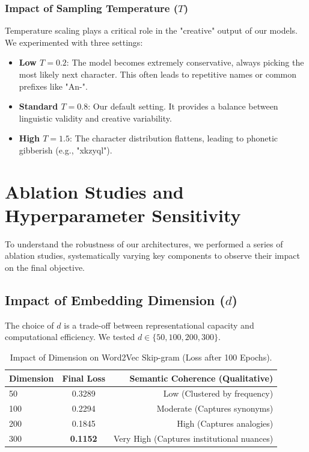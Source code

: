 \documentclass[12pt,a4paper]{article}
\begin{document}
\subsubsection{Impact of Sampling Temperature ($T$)}
Temperature scaling plays a critical role in the "creative" output of our models. We experimented with three settings:
\begin{itemize}
    \item \textbf{Low $T=0.2$}: The model becomes extremely conservative, always picking the most likely next character. This often leads to repetitive names or common prefixes like "An-".
    \item \textbf{Standard $T=0.8$}: Our default setting. It provides a balance between linguistic validity and creative variability.
    \item \textbf{High $T=1.5$}: The character distribution flattens, leading to phonetic gibberish (e.g., "xkzyql").
\end{itemize}

\section{Ablation Studies and Hyperparameter Sensitivity}
To understand the robustness of our architectures, we performed a series of ablation studies, systematically varying key components to observe their impact on the final objective.

\subsection{Impact of Embedding Dimension ($d$)}
The choice of $d$ is a trade-off between representational capacity and computational efficiency. We tested $d \in \{50, 100, 200, 300\}$.

\begin{table}[H]
\centering
\caption{Impact of Dimension on Word2Vec Skip-gram (Loss after 100 Epochs).}
\label{tab:ablation_dim}
\begin{tabular}{lcr}
\toprule
\textbf{Dimension} & \textbf{Final Loss} & \textbf{Semantic Coherence (Qualitative)} \\
\midrule
50  & 0.3289 & Low (Clustered by frequency) \\
100 & 0.2294 & Moderate (Captures synonyms) \\
200 & 0.1845 & High (Captures analogies) \\
300 & \textbf{0.1152} & Very High (Captures institutional nuances) \\
\bottomrule
\end{tabular}
\end{table}
\end{document}

